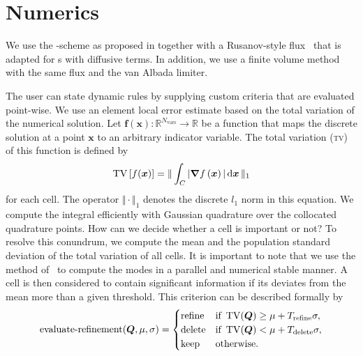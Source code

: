 \documentclass[runningheads]{llncs}
\begin{document}
\section{Numerics}

We use the \aderdg{}-scheme as proposed in \cite{dumbser2008unified} together with a Rusanov-style flux~\cite{gassner2008discontinuous,fambri2017space} that is adapted for \pde{}s with diffusive terms. 
In addition, we use a \muscl{} finite volume method with the same flux and the van Albada  limiter.

The user can state dynamic \amr{} rules by supplying custom criteria that are evaluated point-wise.
We use an element local error estimate based on the total variation of the numerical solution. 
Let $\bm{f}(\bm{x}): \mathbb{R}^{N_\text{vars}} \to \mathbb{R}$ be a function that maps the discrete solution at a point $\bm{x}$ to an arbitrary indicator variable.
The total variation (\textsc{tv}) of this function is defined by
\begin{equation}
  \label{eq:tv}
  \tv \left[ f(\bm{x}) \right] =
  \Vert
\intdcell{ \vert \gradient{f \left( \bm{x} \right)} \vert }
\Vert_1
\end{equation}
for each cell.
The operator $\Vert \cdot \Vert_1$ denotes the discrete $l_1$ norm in this equation.
We compute the integral efficiently with Gaussian quadrature over the collocated quadrature points.
\newcommand{\mean}{\mu}%
\newcommand{\std}{\sigma}%
\newcommand{\variance}{\std^2}%
\newcommand{\Trefine}{T_\text{refine}}%
\newcommand{\Tdelete}{T_\text{delete}}%
How can we decide whether a cell is important or not?
To resolve this conundrum, we compute the mean and the population standard deviation of the total variation of all cells.
It is important to note that we use the method of~\cite{chan1982updating} to compute the modes in a parallel and numerical stable manner.
A cell is then considered to contain significant information if its deviates from the mean more than a given threshold.
This criterion can be described formally by
\begin{equation}
  \label{eq:refinement-criterion}
  \operatorname{evaluate-refinement}(\Q, \mu, \sigma) =
  \begin{cases}
    \text{refine} & \text{if } \tv(\Q) \geq \mu + \Trefine \sigma, \\
    \text{delete} & \text{if } \tv(\Q) < \mu + \Tdelete \sigma, \\
    \text{keep} & \text{otherwise}.
    \end{cases}
\end{equation}
\end{document}
